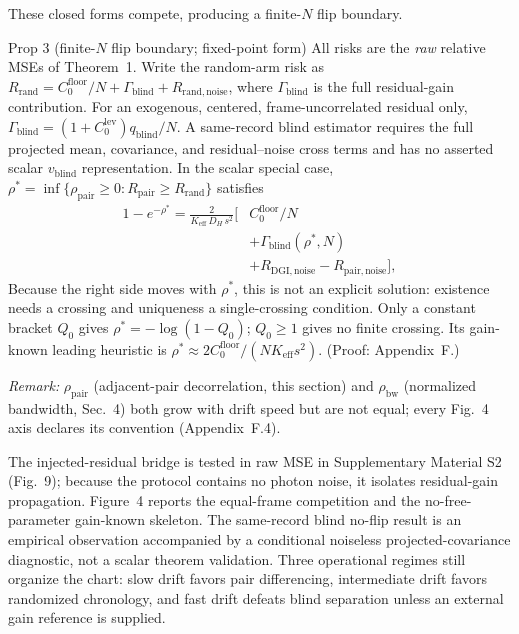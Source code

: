 These closed forms compete, producing a finite-$N$ flip boundary.

\begin{namedthm}{Prop 3 (finite-$N$ flip boundary; fixed-point form)}
All risks are the \emph{raw} relative MSEs of Theorem~1. Write the random-arm risk as $R_{\mathrm{rand}}=C_0^{\mathrm{floor}}/N+\Gamma_{\mathrm{blind}}+R_{\mathrm{rand,noise}}$, where $\Gamma_{\mathrm{blind}}$ is the full residual-gain contribution. For an exogenous, centered, frame-uncorrelated residual only, $\Gamma_{\mathrm{blind}}=(1+C_0^{\mathrm{lev}})q_{\mathrm{blind}}/N$. A same-record blind estimator requires the full projected mean, covariance, and residual--noise cross terms and has no asserted scalar $v_{\mathrm{blind}}$ representation. In the scalar special case, $\rho^{*}=\inf\{\rho_{\mathrm{pair}}\ge0: R_{\mathrm{pair}}\ge R_{\mathrm{rand}}\}$ satisfies
\[
\begin{aligned}
1-e^{-\rho^{*}}=\frac{2}{K_{\mathrm{eff}}\,D_H\,s^{2}}\big[&C_0^{\mathrm{floor}}/N\\
&+\Gamma_{\mathrm{blind}}(\rho^*,N)\\
&+R_{\mathrm{DGI,noise}}-R_{\mathrm{pair,noise}}\big],
\end{aligned}
\]
Because the right side moves with $\rho^*$, this is not an explicit solution: existence needs a crossing and uniqueness a single-crossing condition. Only a constant bracket $Q_0$ gives $\rho^*=-\log(1-Q_0)$; $Q_0\ge1$ gives no finite crossing. Its gain-known leading heuristic is $\rho^{*}\approx2C_0^{\mathrm{floor}}/(NK_{\mathrm{eff}}s^2)$. (Proof: Appendix~F.)
\end{namedthm}

\emph{Remark:} $\rho_{\mathrm{pair}}$ (adjacent-pair decorrelation, this section) and $\rho_{\mathrm{bw}}$ (normalized bandwidth, Sec.~4) both grow with drift speed but are not equal; every Fig.~4 axis declares its convention (Appendix~F.4).

The injected-residual bridge is tested in raw MSE in Supplementary Material S2 (Fig.~9); because the protocol contains no photon noise, it isolates residual-gain propagation. Figure~4 reports the equal-frame competition and the no-free-parameter gain-known skeleton. The same-record blind no-flip result is an empirical observation accompanied by a conditional noiseless projected-covariance diagnostic, not a scalar theorem validation. Three operational regimes still organize the chart: slow drift favors pair differencing, intermediate drift favors randomized chronology, and fast drift defeats blind separation unless an external gain reference is supplied.

